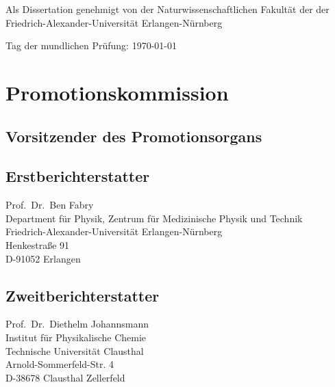 \begin{otherlanguage}{german}
Als Dissertation genehmigt von der Naturwissenschaftlichen Fakultät der                                                                                                                                                                        
der Friedrich-Alexander-Universität Erlangen-Nürnberg
\vspace{0.5cm}

Tag der mundlichen Prüfung: \today\\
\vspace{0.5cm}

\section*{Promotionskommission}
\subsection{Vorsitzender des Promotionsorgans}

\subsection*{Erstberichterstatter}
Prof.~Dr.~Ben Fabry\\
Department für Physik, Zentrum für Medizinische Physik und Technik\\
Friedrich-Alexander-Universität Erlangen-Nürnberg\\
Henkestraße 91\\
D-91052 Erlangen
\subsection*{Zweitberichterstatter}
Prof.~Dr.~Diethelm Johannsmann\\
Institut für Physikalische Chemie\\
Technische Universität Clausthal\\
Arnold-Sommerfeld-Str. 4\\
D-38678 Clausthal Zellerfeld
\end{otherlanguage}
